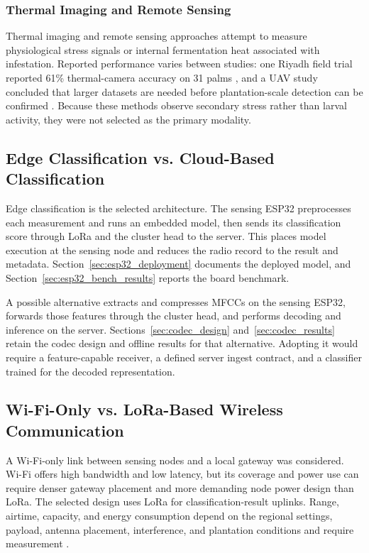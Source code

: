 \documentclass[12pt,a4paper,oneside]{memoir}
\newcommand{\newrevision}[1]{#1}
\begin{document}
\subsubsection{Thermal Imaging and Remote Sensing}
Thermal imaging and remote sensing approaches attempt to measure physiological stress signals or internal fermentation heat associated with infestation. \newrevision{Reported performance varies between studies: one Riyadh field trial reported 61\% thermal-camera accuracy on 31 palms \cite{rasool2020}, and a UAV study concluded that larger datasets are needed before plantation-scale detection can be confirmed \cite{delalieux2023}. Because these methods observe secondary stress rather than larval activity, they were not selected as the primary modality.}

\subsection{Edge Classification vs. Cloud-Based Classification}

\newrevision{Edge classification is the selected architecture. The sensing ESP32 preprocesses each measurement and runs an embedded model, then sends its classification score through LoRa and the cluster head to the server. This places model execution at the sensing node and reduces the radio record to the result and metadata. Section~\ref{sec:esp32_deployment} documents the deployed model, and Section~\ref{sec:esp32_bench_results} reports the board benchmark.}

\newrevision{A possible alternative extracts and compresses MFCCs on the sensing ESP32, forwards those features through the cluster head, and performs decoding and inference on the server. Sections~\ref{sec:codec_design} and~\ref{sec:codec_results} retain the codec design and offline results for that alternative. Adopting it would require a feature-capable receiver, a defined server ingest contract, and a classifier trained for the decoded representation.}


\subsection{Wi-Fi-Only vs. LoRa-Based Wireless Communication}

\newrevision{A Wi-Fi-only link between sensing nodes and a local gateway was considered. Wi-Fi offers high bandwidth and low latency, but its coverage and power use can require denser gateway placement and more demanding node power design than LoRa. The selected design uses LoRa for classification-result uplinks. Range, airtime, capacity, and energy consumption depend on the regional settings, payload, antenna placement, interference, and plantation conditions and require measurement \cite{lorawan2023}.}
\end{document}
